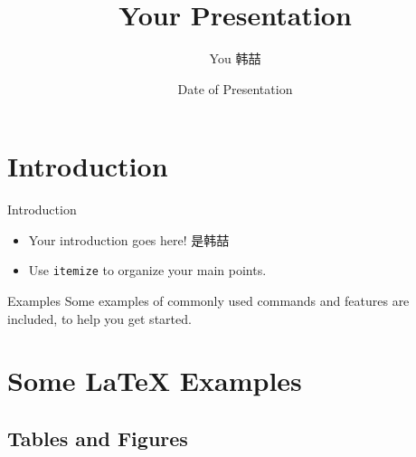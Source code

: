 \documentclass[color=usenames,dvipsnames]{beamer}
\title[Your Short Title]{Your Presentation}
\author{You 韩喆}
\institute{Where You're From}
\date{Date of Presentation}
\begin{document}
\begin{frame}
  \titlepage
\end{frame}


\section{Introduction}

\begin{frame}{Introduction}

\begin{itemize}
  \item Your introduction goes here! 是韩喆
  \item Use \texttt{itemize} to organize your main points.
\end{itemize}

\vskip 1cm

\begin{block}{Examples}
Some examples of commonly used commands and features are included, to help you get started.
\end{block}

\end{frame}

\section{Some \LaTeX{} Examples}

\subsection{Tables and Figures}
\end{document}
